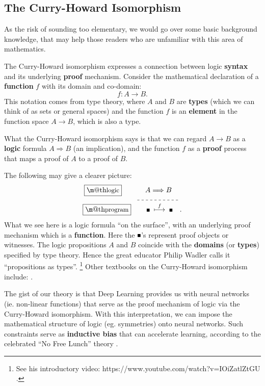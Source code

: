 \documentclass[orivec]{llncs}
\makeatletter
\newcommand{\witness}{\scalebox{0.6}{$\blacksquare$}}
\newcommand{\underdash}[1]{%
	\tikz[baseline=(toUnderline.base)]{
		\node[inner sep=1pt,outer sep=10pt] (toUnderline) {#1};
		\draw[dashed] ([yshift=-0pt]toUnderline.south west) -- ([yshift=-0pt]toUnderline.south east);
	}%
}%
\renewcommand{\boxed}[1]{\fbox{\m@th$\displaystyle\scalebox{0.9}{#1}$} \,}
\makeatother
\begin{document}
\subsection{The Curry-Howard Isomorphism}

As the risk of sounding too elementary, we would go over some basic background knowledge, that may help those readers who are unfamiliar with this area of mathematics.

The Curry-Howard isomorphism expresses a connection between logic \textbf{syntax} and its underlying \textbf{proof} mechanism.  Consider the mathematical declaration of a \textbf{function} $f$ with its domain and co-domain:
\begin{equation}
f: A \rightarrow B .
\end{equation}
This notation comes from type theory, where $A$ and $B$ are \textbf{types} (which we can think of as sets or general spaces) and the function $f$ is an \textbf{element} in the function space $A \rightarrow B$, which is also a type.

What the Curry-Howard isomorphism says is that we can regard $A \rightarrow B$ as a \textbf{logic} formula $A \Rightarrow B$ (an implication), and the function $f$ as a \textbf{proof} process that maps a proof of $A$ to a proof of $B$.

The following may give a clearer picture:
\begin{equation}
\label{eqn:Curry-Howard}
\begin{aligned}
\boxed{\mbox{logic}} \quad \quad \underdash{$A \Longrightarrow B$} & \\
\boxed{\mbox{program}} \quad \quad \witness \; \stackrel{f}{\longmapsto} \; \witness \hspace*{10pt} & .
\end{aligned}
\end{equation}
What we see here is a logic formula ``on the surface'', with an underlying proof mechanism which is a \textbf{function}.  Here the $\witness$'s represent proof objects or witnesses.  The logic propositions $A$ and $B$ coincide with the \textbf{domains} (or \textbf{types}) specified by type theory.  Hence the great educator Philip Wadler calls it ``propositions as types''. \footnote{See his introductory video: https://www.youtube.com/watch?v=IOiZatlZtGU .} 
Other textbooks on the Curry-Howard isomorphism include: \cite{Sorensen2006} \cite{Simmons2000} \cite{Thompson1991}.

The gist of our theory is that Deep Learning provides us with neural networks (ie. non-linear functions) that serve as the proof mechanism of logic via the Curry-Howard isomorphism.  With this interpretation, we can impose the mathematical structure of logic (eg. symmetries) onto neural networks.  Such constraints serve as \textbf{inductive bias} that can accelerate learning, according to the celebrated ``No Free Lunch'' theory \cite{Wolpert1997}.
\end{document}

